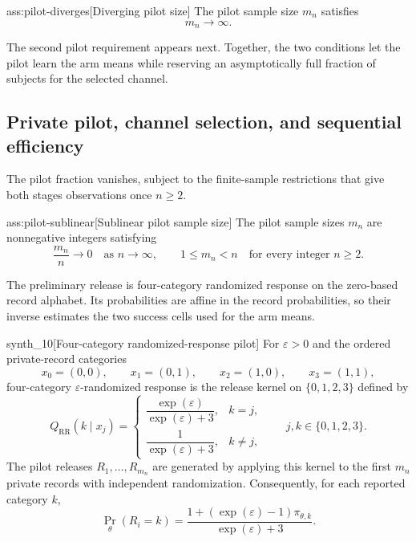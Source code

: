 \documentclass[11pt]{article}
\begin{document}
\begin{assumptionv}{ass:pilot-diverges}[Diverging pilot size]
The pilot sample size \(m_n\) satisfies
\[
m_n\to\infty.
\]
\end{assumptionv}

The second pilot requirement appears next. Together, the two conditions let the pilot learn the arm means while reserving an asymptotically full fraction of subjects for the selected channel.

\subsection{Private pilot, channel selection, and sequential efficiency}

The pilot fraction vanishes, subject to the finite-sample restrictions that give both stages observations once \(n\ge2\).

\begin{assumptionv}{ass:pilot-sublinear}[Sublinear pilot sample size]
The pilot sample sizes \(m_n\) are nonnegative integers satisfying
\[
\frac{m_n}{n}\longrightarrow 0
\quad\text{as }n\to\infty,
\qquad
1\le m_n<n
\quad\text{for every integer }n\ge2.
\]
\end{assumptionv}

The preliminary release is four-category randomized response on the zero-based record alphabet. Its probabilities are affine in the record probabilities, so their inverse estimates the two success cells used for the arm means.

\begin{definitionv}{synth_10}[Four-category randomized-response pilot]
For \(\varepsilon>0\) and the ordered private-record categories
\[
x_0=(0,0),\qquad x_1=(0,1),\qquad
x_2=(1,0),\qquad x_3=(1,1),
\]
four-category \(\varepsilon\)-randomized response is the release kernel on \(\{0,1,2,3\}\) defined by
\[
Q_{\mathrm{RR}}(k\mid x_j)
=
\begin{cases}
\dfrac{\exp(\varepsilon)}{\exp(\varepsilon)+3},&k=j,\\[6pt]
\dfrac{1}{\exp(\varepsilon)+3},&k\ne j,
\end{cases}
\qquad j,k\in\{0,1,2,3\}.
\]
The pilot releases \(R_1,\ldots,R_{m_n}\) are generated by applying this kernel to the first \(m_n\) private records with independent randomization. Consequently, for each reported category \(k\),
\[
\Pr_\theta(R_i=k)
=\frac{1+(\exp(\varepsilon)-1)\pi_{\theta,k}}
       {\exp(\varepsilon)+3}.
\]
\end{definitionv}
\end{document}
